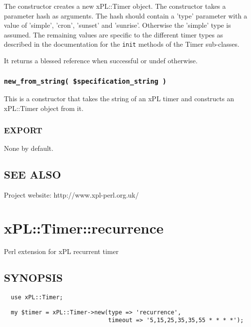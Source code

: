 The constructor creates a new xPL::Timer object.  The constructor
takes a parameter hash as arguments.  The hash should contain a 'type'
parameter with a value of 'simple', 'cron', 'sunset' and 'sunrise'.
Otherwise the 'simple' type is assumed.  The remaining values are
specific to the different timer types as described in the
documentation for the \texttt{init} methods of the Timer sub-classes.



It returns a blessed reference when successful or undef otherwise.

\subsubsection*{\texttt{new\_from\_string( \$specification\_string )}\label{xPL::Timer_new_from_string_specification_string_}}


This is a constructor that takes the string of an xPL timer and
constructs an xPL::Timer object from it.

\subsubsection*{EXPORT\label{xPL::Timer_EXPORT}}


None by default.

\subsection*{SEE ALSO\label{xPL::Timer_SEE_ALSO}}


Project website: http://www.xpl-perl.org.uk/

\section{xPL::Timer::recurrence\label{xPL::Timer::recurrence}}


Perl extension for xPL recurrent timer

\subsection*{SYNOPSIS\label{xPL::Timer::recurrence_SYNOPSIS}}
\begin{verbatim}
  use xPL::Timer;
\end{verbatim}
\begin{verbatim}
  my $timer = xPL::Timer->new(type => 'recurrence',
                              timeout => '5,15,25,35,35,55 * * * *');
\end{verbatim}
